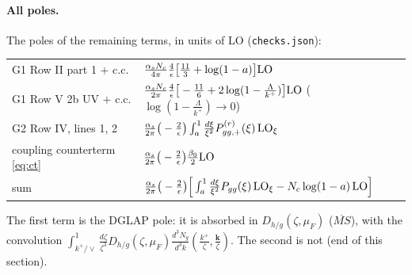 \documentclass[9pt]{article}
\numberwithin{equation}{section}
\begin{document}
\paragraph{All poles.} The poles of the remaining terms, in units of LO (\texttt{checks.json}):
\begin{center}\small
\begin{tabular}{@{}ll@{}}\hline
G1 Row II part 1 $+$ c.c. & $\frac{\alpha_sN_c}{4\pi}\frac{4}{\epsilon}\big[\frac{11}{3}+\log(1-a)\big]{\rm LO}$\\
G1 Row V 2b UV $+$ c.c. & $\frac{\alpha_sN_c}{2\pi}\frac{4}{\epsilon}\big[-\frac{11}{6}+2\log(1-\frac{\Lambda}{k^+})\big]{\rm LO}$ \quad($\log(1-\frac{\Lambda}{k^+})\to0$)\\
G2 Row IV, lines 1, 2 & $\frac{\alpha_s}{2\pi}\big(-\frac{2}{\epsilon}\big)\int_a^1\frac{d\xi}{\xi^2}P^{(r)}_{gg,+}(\xi)\,{\rm LO}_\xi$\\
coupling counterterm \eqref{eq:ct} & $\frac{\alpha_s}{2\pi}\big(-\frac{2}{\epsilon}\big)\frac{\beta_0}{2}{\rm LO}$\\\hline
sum & $\frac{\alpha_s}{2\pi}\big(-\frac{2}{\epsilon}\big)\Big[\int_a^1\frac{d\xi}{\xi^2}P_{gg}(\xi)\,{\rm LO}_\xi-N_c\log(1-a)\,{\rm LO}\Big]$\\\hline
\end{tabular}
\end{center}
The first term is the DGLAP pole: it is absorbed in $D_{h/g}(\zeta,\mu_F)$ ($\overline{MS}$), with the convolution $\int_{k^+/\vee}^1\frac{d\zeta}{\zeta^3}D_{h/g}(\zeta,\mu_F)\frac{d^3N_g}{d^3k}(\frac{k^+}{\zeta},\frac{\mathbf k}{\zeta})$. The second is not (end of this section).
\end{document}
